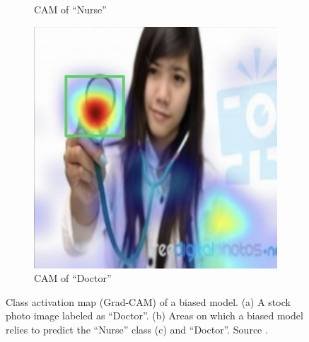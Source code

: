 \begin{figure}
\begin{subfigure}{0.3\columnwidth}
    \caption{CAM of ``Nurse''}
    \label{fig:biased-model-cam-nurse}
  \end{subfigure}
  \begin{subfigure}{0.3\columnwidth}
    \includegraphics[width=0.95\columnwidth, height=0.95\columnwidth]{img/2-related-work/bias-computer-vision-doctor-cam.png}
    \caption{CAM of  ``Doctor''}
    \label{fig:biased-model-doctor}
  \end{subfigure}

  \caption[Class activation maps (Grad-CAM) of a biased model]{Class activation map (Grad-CAM) of a biased model. (a) A stock photo image labeled as ``Doctor''. (b) Areas on which a biased model relies to predict the ``Nurse'' class (c) and ``Doctor''. Source \cite{gradcam}.}
  \label{fig:realbiased-model}
\end{figure}


